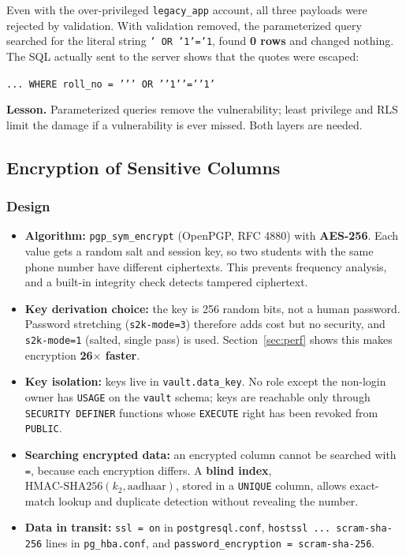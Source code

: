 \documentclass[11pt,a4paper]{report}
\begin{document}
Even with the over-privileged \texttt{legacy\_app} account, all three payloads were rejected by validation. With validation removed, the parameterized query searched for the literal string \texttt{' OR '1'='1}, found \textbf{0 rows} and changed nothing. The SQL actually sent to the server shows that the quotes were escaped:
\begin{center}
\texttt{... WHERE roll\_no = '{}'{}' OR '{}'1'{}'='{}'1'}
\end{center}

\textbf{Lesson.} Parameterized queries remove the vulnerability; least privilege and RLS limit the damage if a vulnerability is ever missed. Both layers are needed.

\subsection{Encryption of Sensitive Columns}
\label{sec:enc}
\subsubsection{Design}
\begin{itemize}
    \item \textbf{Algorithm:} \texttt{pgp\_sym\_encrypt} (OpenPGP, RFC 4880) with \textbf{AES-256}. Each value gets a random salt and session key, so two students with the same phone number have different ciphertexts. This prevents frequency analysis, and a built-in integrity check detects tampered ciphertext.
    \item \textbf{Key derivation choice:} the key is 256 random bits, not a human password. Password stretching (\texttt{s2k-mode=3}) therefore adds cost but no security, and \texttt{s2k-mode=1} (salted, single pass) is used. Section~\ref{sec:perf} shows this makes encryption \textbf{26$\times$ faster}.
    \item \textbf{Key isolation:} keys live in \texttt{vault.data\_key}. No role except the non-login owner has \texttt{USAGE} on the \texttt{vault} schema; keys are reachable only through \texttt{SECURITY DEFINER} functions whose \texttt{EXECUTE} right has been revoked from \texttt{PUBLIC}.
    \item \textbf{Searching encrypted data:} an encrypted column cannot be searched with \texttt{=}, because each encryption differs. A \textbf{blind index}, $\text{HMAC-SHA256}(k_2, \text{aadhaar})$, stored in a \texttt{UNIQUE} column, allows exact-match lookup and duplicate detection without revealing the number.
    \item \textbf{Data in transit:} \texttt{ssl = on} in \texttt{postgresql.conf}, \texttt{hostssl ... scram-sha-256} lines in \texttt{pg\_hba.conf}, and \texttt{password\_encryption = scram-sha-256}.
\end{itemize}
\end{document}

